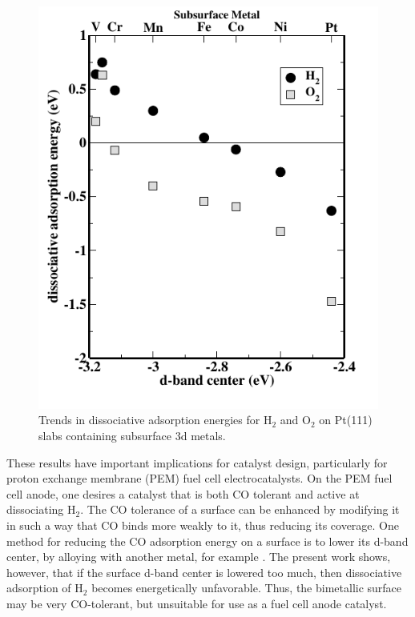 \documentclass[aps,preprint,superscriptaddress,endfloats*]{revtex4}
\begin{document}
\begin{figure}
\includegraphics{figures/figure4}%
\caption{\label{fig4}
  Trends in dissociative adsorption energies for H$_2$ and O$_2$ on
  Pt(111) slabs containing subsurface 3d metals. }
\end{figure}

These results have important implications for catalyst design,
particularly for proton exchange membrane (PEM) fuel cell
electrocatalysts.  On the PEM fuel cell anode, one desires a catalyst
that is both CO tolerant and active at dissociating H$_2$.  The CO
tolerance of a surface can be enhanced by modifying it in such a way
that CO binds more weakly to it, thus reducing its coverage.  One
method for reducing the CO adsorption energy on a surface is to lower
its d-band center, by alloying with another metal, for example
\cite{hammer1996:_co}.  The present work shows, however, that if the surface
d-band center is lowered too much, then dissociative adsorption of
H$_2$ becomes energetically unfavorable.  Thus, the bimetallic surface
may be very CO-tolerant, but unsuitable for use as a fuel cell anode
catalyst.
\end{document}
